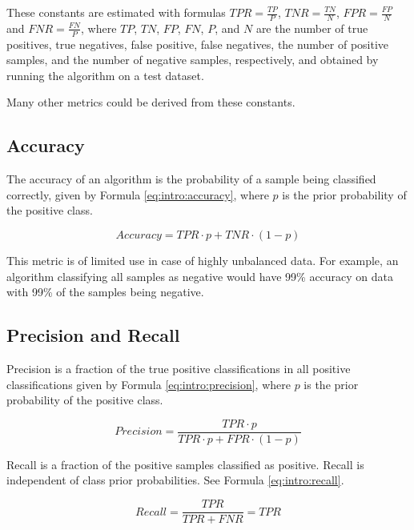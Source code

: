 These constants are estimated with formulas $\mathit{TPR} =
\frac{\mathit{TP}}{P}$, $\mathit{TNR} = \frac{\mathit{TN}}{N}$, $\mathit{FPR} =
\frac{\mathit{FP}}{N}$ and $\mathit{FNR} = \frac{\mathit{FN}}{P}$, where
$\mathit{TP}$, $\mathit{TN}$, $\mathit{FP}$, $\mathit{FN}$, $P$, and $N$ are
the number of true positives, true negatives, false positive, false negatives,
the number of positive samples, and the number of negative samples,
respectively, and obtained by running the algorithm on a test dataset.

Many other metrics could be derived from these constants.

\subsection{Accuracy}

The accuracy of an algorithm is the probability of a sample being classified
correctly, given by Formula \ref{eq:intro:accuracy}, where $p$ is the prior
probability of the positive class.

\begin{equation}
  \mathit{Accuracy} = \mathit{TPR} \cdot p + \mathit{TNR} \cdot (1 - p)
  \label{eq:intro:accuracy}
\end{equation}

This metric is of limited use in case of highly unbalanced data. For example,
an algorithm classifying all samples as negative would have 99\% accuracy on
data with 99\% of the samples being negative.

\subsection{Precision and Recall}

Precision is a fraction of the true positive classifications in all positive
classifications given by Formula \ref{eq:intro:precision}, where $p$ is the
prior probability of the positive class.

\begin{equation}
  \mathit{Precision} = \frac{\mathit{TPR} \cdot p}{\mathit{TPR} \cdot p +
    \mathit{FPR} \cdot (1 - p)}
  \label{eq:intro:precision}
\end{equation}

Recall is a fraction of the positive samples classified as positive. Recall is
independent of class prior probabilities. See Formula \ref{eq:intro:recall}.

\begin{equation}
  \mathit{Recall} = \frac{\mathit{TPR}}{\mathit{TPR} + \mathit{FNR}} =
  \mathit{TPR}
  \label{eq:intro:recall}
\end{equation}

